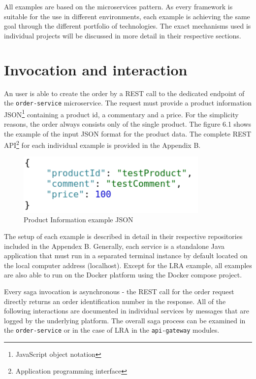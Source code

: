 \documentclass[oneside,
  digital, %
  table,   %
  nolof,     %
  nolot,     %
]{fithesis3}
\begin{document}
All examples are based on the microservices pattern. As every framework is suitable for the use in different environments, each example is achieving the same goal through the different portfolio of technologies. The exact mechanisms used is individual projects will be discussed in more detail in their respective sections.

\section{Invocation and interaction}

An user is able to create the order by a REST call to the dedicated endpoint of the \texttt{order-service} microservice. The request must provide a product information JSON\footnote{JavaScript object notation} containing a product id, a commentary and a price. For the simplicity reasons, the order always consists only of the single product. The figure 6.1 shows the example of the input JSON format for the product data. The complete REST API\footnote{Application programming interface} for each individual example is provided in the Appendix B.

\begin{figure}
    \begin{center}
        \includegraphics[height=30mm]{images/productInfoJSON.png}
    \end{center}
    \caption{Product Information example JSON}
\end{figure}

The setup of each example is described in detail in their respective repositories included in the Appendex B. Generally, each service is a standalone Java application that must run in a separated terminal instance by default located on the local computer address (localhost). Except for the LRA example, all examples are also able to run on the Docker\cite{docker} platform using the Docker compose project\cite{docker_compose}.

Every saga invocation is asynchronous - the REST call for the order request directly returns an order identification number in the response. All of the following interactions are documented in individual services by messages that are logged by the underlying platform. The overall saga process can be examined in the \texttt{order-service} or in the case of LRA in the \texttt{api-gateway} modules.
\end{document}
